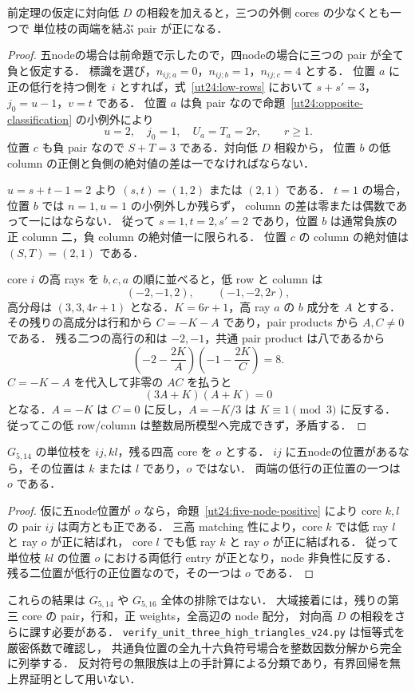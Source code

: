 \begin{proposition}
\label{ut24:positive-witness}
前定理の仮定に対向低 $D$ の相殺を加えると，三つの外側 cores の少なくとも一つで
単位枝の両端を結ぶ pair が正になる．
\end{proposition}

\begin{proof}
五nodeの場合は前命題で示したので，四nodeの場合に三つの pair が全て負と仮定する．
標識を選び，$n_{ij;a}=0$，$n_{ij;b}=1$，$n_{ij;c}=4$ とする．
位置 $a$ に正の低行を持つ側を $i$ とすれば，式~\eqref{ut24:low-rows} において
$s+s'=3$，$j_0=u-1$，$v=t$ である．
位置 $a$ は負 pair なので命題~\ref{ut24:opposite-classification} の小例外により
\[
 u=2,\quad j_0=1,\quad U_a=T_a=2r,\qquad r\ge1.
\]
位置 $c$ も負 pair なので $S+T=3$ である．対向低 $D$ 相殺から，
位置 $b$ の低 column の正側と負側の絶対値の差は一でなければならない．

$u=s+t-1=2$ より $(s,t)=(1,2)$ または $(2,1)$ である．
$t=1$ の場合，位置 $b$ では $n=1,u=1$ の小例外しか残らず，
column の差は零または偶数であって一にはならない．
従って $s=1,t=2,s'=2$ であり，位置 $b$ は通常負族の
正 column 二，負 column の絶対値一に限られる．
位置 $c$ の column の絶対値は $(S,T)=(2,1)$ である．

core $i$ の高 rays を $b,c,a$ の順に並べると，低 row と column は
\[
 (-2,-1,2),\qquad(-1,-2,2r),
\]
高分母は $(3,3,4r+1)$ となる．$K=6r+1$，高 ray $a$ の $b$ 成分を $A$ とする．
その残りの高成分は行和から $C=-K-A$ であり，pair products から $A,C\ne0$ である．
残る二つの高行の和は $-2,-1$，共通 pair product は八であるから
\[
 \left(-2-\frac{2K}{A}\right)
 \left(-1-\frac{2K}{C}\right)=8.
\]
$C=-K-A$ を代入して非零の $AC$ を払うと
\[
 (3A+K)(A+K)=0
\]
となる．$A=-K$ は $C=0$ に反し，$A=-K/3$ は $K\equiv1\pmod3$ に反する．
従ってこの低 row/column は整数局所模型へ完成できず，矛盾する．
\end{proof}

\begin{corollary}[$G_{5,14}$ の五node位置]
\label{ut24:g514-five-node}
$G_{5,14}$ の単位枝を $ij,kl$，残る四高 core を $o$ とする．
$ij$ に五nodeの位置があるなら，その位置は $k$ または $l$ であり，$o$ ではない．
両端の低行の正位置の一つは $o$ である．
\end{corollary}

\begin{proof}
仮に五node位置が $o$ なら，命題~\ref{ut24:five-node-positive} により core $k,l$ の pair $ij$ は両方とも正である．
三高 matching 性により，core $k$ では低 ray $l$ と ray $o$ が正に結ばれ，
core $l$ でも低 ray $k$ と ray $o$ が正に結ばれる．
従って単位枝 $kl$ の位置 $o$ における両低行 entry が正となり，node 非負性に反する．
残る二位置が低行の正位置なので，その一つは $o$ である．
\end{proof}

これらの結果は $G_{5,14}$ や $G_{5,16}$ 全体の排除ではない．
大域接着には，残りの第三 core の pair，行和，正 weights，全高辺の node 配分，
対向高 $D$ の相殺をさらに課す必要がある．
\nolinkurl{verify_unit_three_high_triangles_v24.py} は恒等式を厳密係数で確認し，
共通負位置の全九十六負符号場合を整数因数分解から完全に列挙する．
反対符号の無限族は上の手計算による分類であり，有界回帰を無上界証明として用いない．
